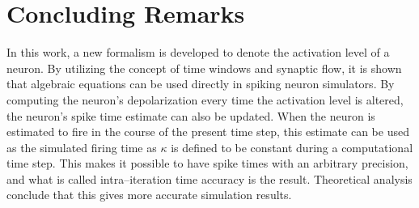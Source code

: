 \section{Concluding Remarks}

	In this work, a new formalism is developed to denote the activation level of a neuron.
	By utilizing the concept of time windows and synaptic flow, it is shown that algebraic equations can be used directly in spiking neuron simulators.
	By computing the neuron's depolarization every time the activation level is altered, the neuron's spike time estimate can also be updated.
	When the neuron is estimated to fire in the course of the present time step, this estimate can be used as the simulated firing time as $\kappa$ is defined to be constant during a computational time step.
	This makes it possible to have spike times with an arbitrary precision, and what is called intra--iteration time accuracy is the result.
	Theoretical analysis conclude that this gives more accurate simulation results.

